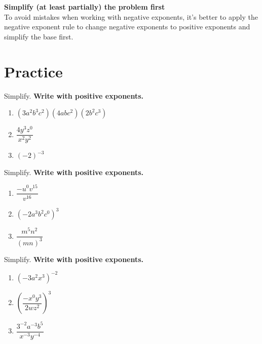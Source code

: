 \documentclass[en,11pt]{elegantbook}
\newcommand{\size}[2]{{\fontsize{#1}{0}\selectfont#2}}
\newenvironment{rmdtip}{
	\vspace*{0.5\baselineskip}
	\par\noindent
	\makebox[-3pt][r]{\color{red!90}\size{12}{\HandRight}\,\,}
    \begin{tcolorbox}[
    enhanced,
    title={\textbf{\color{second}Tips}},
    title style={left color=blue!10!green!20!white,right color=yellow!20!blue!20!white},
    colback=cyan!10!white,
    ]
    \sffamily
}{
    \end{tcolorbox}
    \par\ignorespacesafterend
}
\let\BeginKnitrBlock\begin \let\EndKnitrBlock\end
\begin{document}
\begin{rmdtip}

\textbf{Simplify (at least partially) the problem first}\\
To avoid mistakes when working with negative exponents, it's better to apply the negative exponent rule to change negative exponents to positive exponents and simplify the base first.

\end{rmdtip}

\newpage

\hypertarget{practice}{%
\section{Practice}\label{practice}}

\BeginKnitrBlock{exercise}
\protect\hypertarget{exr:unnamed-chunk-3}{}{\label{exr:unnamed-chunk-3} }
Simplify. \textbf{Write with positive exponents.}

\begin{enumerate}
\def\labelenumi{\arabic{enumi}.}

\item
  \((3a^2b^3c^2)(4abc^2)(2b^2c^3)\)
\item
  \(\dfrac{4y^3z^0}{x^2y^2}\)
\item
  \((-2)^{-3}\)
\end{enumerate}
\EndKnitrBlock{exercise}

\BeginKnitrBlock{exercise}
\protect\hypertarget{exr:unnamed-chunk-4}{}{\label{exr:unnamed-chunk-4} }
Simplify. \textbf{Write with positive exponents.}

\begin{enumerate}
\def\labelenumi{\arabic{enumi}.}

\item
  \(\dfrac{-u^0v^{15}}{v^{16}}\)
\item
  \((-2a^3b^2c^0)^3\)
\item
  \(\dfrac{m^5 n^{2}}{(mn)^3}\)
\end{enumerate}
\EndKnitrBlock{exercise}

\BeginKnitrBlock{exercise}
\protect\hypertarget{exr:unnamed-chunk-5}{}{\label{exr:unnamed-chunk-5} }
Simplify. \textbf{Write with positive exponents.}

\begin{enumerate}
\def\labelenumi{\arabic{enumi}.}

\item
  \((-3a^2x^3)^{-2}\)
\item
  \(\left(\dfrac{-x^0y^3}{2wz^2}\right)^3\)
\item
  \(\dfrac{3^{-2}a^{-3}b^5}{x^{-3}y^{-4}}\)
\end{enumerate}
\EndKnitrBlock{exercise}
\end{document}
